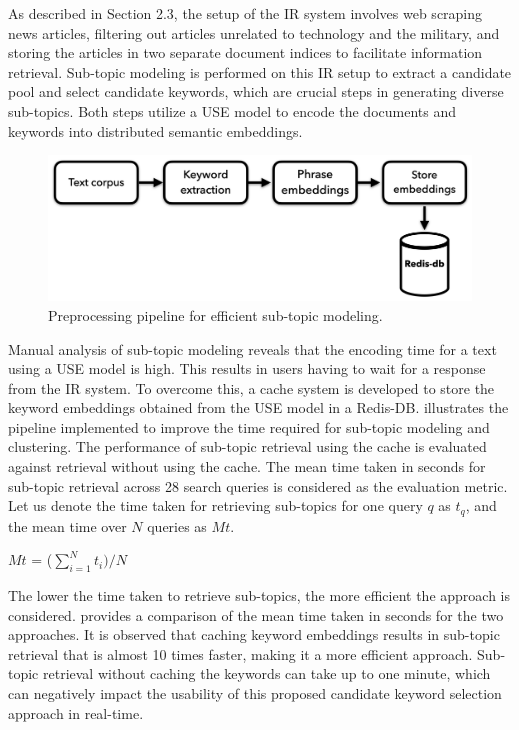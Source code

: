 As described in Section 2.3, the setup of the \ac{IR} system involves web scraping news articles, filtering out articles unrelated to technology and the military, and storing the articles in two separate document indices to facilitate information retrieval. Sub-topic modeling is performed on this \ac{IR} setup to extract a candidate pool and select candidate keywords, which are crucial steps in generating diverse sub-topics. Both steps utilize a \ac{USE} model to encode the documents and keywords into distributed semantic embeddings.


\begin{figure}[h]
	\centering
	\includegraphics[width=.9\textwidth]{images/thesis_images/redisdb.png}
	\caption[Pjpeline for efficient sub-topics.]{Preprocessing pipeline for efficient sub-topic modeling. \label{fig:redis_db}}
\end{figure}

Manual analysis of sub-topic modeling reveals that the encoding time for a text using a \ac{USE} model is high. This results in users having to wait for a response from the \ac{IR} system. To overcome this, a cache system is developed to store the keyword embeddings obtained from the \ac{USE} model in a Redis-DB.  illustrates the pipeline implemented to improve the time required for sub-topic modeling and clustering. The performance of sub-topic retrieval using the cache is evaluated against retrieval without using the cache. The mean time taken in seconds for sub-topic retrieval across 28 search queries is considered as the evaluation metric. Let us denote the time taken for retrieving sub-topics for one query $q$ as $t_q$, and the mean time over $N$ queries as $Mt$.


\centerline{$Mt$ = ($\sum\limits_{i=1}^N t_i) /N$}

The lower the time taken to retrieve sub-topics, the more efficient the approach is considered.  provides a comparison of the mean time taken in seconds for the two approaches. It is observed that caching keyword embeddings results in sub-topic retrieval that is almost 10 times faster, making it a more efficient approach. Sub-topic retrieval without caching the keywords can take up to one minute, which can negatively impact the usability of this proposed candidate keyword selection approach in real-time.



